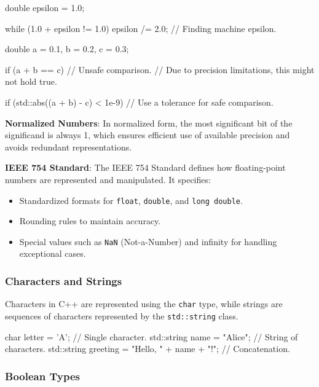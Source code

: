 \begin{exampleblock}
    \begin{codeblock}[language=C++]
double epsilon = 1.0;
        
while (1.0 + epsilon != 1.0) {
    epsilon /= 2.0; // Finding machine epsilon.
}
    \end{codeblock}
    \begin{codeblock}[language=C++]
double a = 0.1, b = 0.2, c = 0.3;

if (a + b == c) { // Unsafe comparison.
    // Due to precision limitations, this might not hold true.
}

if (std::abs((a + b) - c) < 1e-9) {
    // Use a tolerance for safe comparison.
}
    \end{codeblock}
\end{exampleblock}

\textbf{Normalized Numbers}: In normalized form, the most significant bit of the significand is always 1, which ensures efficient use of available precision and avoids redundant representations.

\textbf{IEEE 754 Standard}: The IEEE 754 Standard defines how floating-point numbers are represented and manipulated. It specifies:

\begin{itemize}
    \item Standardized formats for \texttt{float}, \texttt{double}, and \texttt{long double}.
    \item Rounding rules to maintain accuracy.
    \item Special values such as \texttt{NaN} (Not-a-Number) and infinity for handling exceptional cases.
\end{itemize}


\subsubsection{Characters and Strings}

Characters in C++ are represented using the \texttt{char} type, while strings are sequences of characters represented by the \texttt{std::string} class.

\begin{codeblock}[language=C++, numbers=none]
char letter = 'A'; // Single character.
std::string name = "Alice"; // String of characters.
std::string greeting = "Hello, " + name + "!"; // Concatenation.
\end{codeblock}

\subsubsection{Boolean Types}

